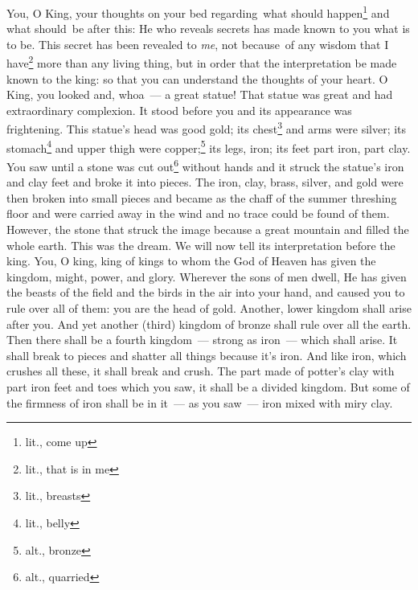 \begin{inparaenum}
     You, O King, your thoughts on your bed regarding\understood\ what should happen\footnote{lit., come up} and what should\understood\ be after this: He who reveals secrets has made known to you what is to be.%
     This secret has been revealed to \emph{me}, not because\understood\ of any wisdom that I have\footnote{lit., that is in me} more than any living thing, but in order that the interpretation be made known to the king: so that you can understand the thoughts of your heart.%
     O King, you looked and, whoa~--- a great statue! That statue was great and had extraordinary complexion. It stood before you and its appearance was frightening.%
     This statue's head was good gold; its chest\footnote{lit., breasts} and arms were silver; its stomach\footnote{lit., belly} and upper thigh were copper;\footnote{alt., bronze}%
     its legs, iron; its feet part iron, part clay.%
     You saw until a stone was cut out\footnote{alt., quarried} without hands and it struck the statue's iron and clay feet and broke it into pieces.%
     The iron, clay, brass, silver, and gold were then broken into small pieces and became as the chaff of the summer threshing floor and were carried away in the wind and no trace could be found of them. However, the stone that struck the image because a great mountain and filled the whole earth.%
     This was the dream. We will now tell its interpretation before the king.%
     You, O king, king of kings to whom the God of Heaven has given the kingdom, might, power, and glory.%
     Wherever the sons of men dwell, He has given the beasts of the field and the birds in the air into your hand, and caused you to rule over all of them: you are the head of gold.%
     Another, lower kingdom shall arise after you. And yet another (third) kingdom of bronze shall rule over all the earth.%
     Then there shall be a fourth kingdom~--- strong as iron~--- which shall arise. It shall break to pieces and shatter all things because it's iron. And like iron, which crushes all these, it shall break and crush.%
     The part made of potter's clay with part iron feet and toes which you saw, it shall be a divided kingdom. But some of the firmness of iron shall be in it~--- as you saw~--- iron mixed with miry clay.%

\end{inparaenum}
